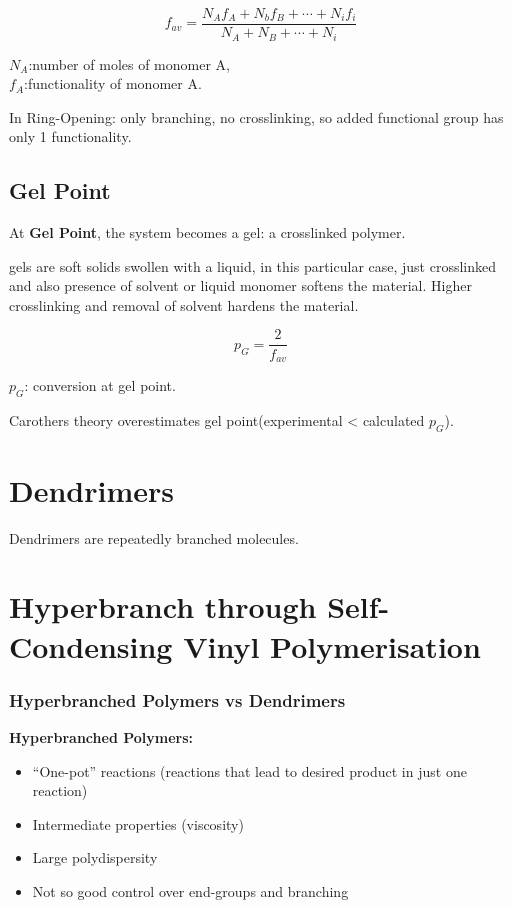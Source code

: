 \documentclass{NoteThesis/note-thesis}
\begin{document}
\begin{equation*}
    f_{av} = \frac{N_A f_A+N_b f_B+ \cdots +N_i f_i}{N_A+N_B+ \cdots +N_i}
\end{equation*}

{\noindent
$N_A$:number of moles of monomer A,\\
$f_A$:functionality of monomer A.}

In Ring-Opening: only branching, no crosslinking, so added functional group has only 1 functionality.

\subsection{Gel Point}

At \textbf{Gel Point}, the system becomes a gel:
a crosslinked polymer.

gels are soft solids swollen with a liquid, in this particular case, just crosslinked and also presence of solvent or liquid monomer softens the material. Higher crosslinking and removal of solvent hardens the material.

\begin{equation*}
    p_G = \frac{2}{f_{av}}
\end{equation*}

$p_G$: conversion at gel point.

\begin{mynote_env}[frametitle=Note]
    Carothers theory overestimates gel point(experimental < calculated $p_G$).
\end{mynote_env}

\newpage
\section{Dendrimers}

Dendrimers are repeatedly branched molecules.


\section[Hyperbranched through SCVP]{Hyperbranch through Self-Condensing Vinyl Polymerisation}

\subsubsection*{Hyperbranched Polymers vs Dendrimers}

\textbf{Hyperbranched Polymers:}
\begin{itemize}
    \item[$\checkmark$] ``One-pot'' reactions (reactions that lead to desired product in just one reaction)
    \item[$\checkmark$] Intermediate properties (viscosity)
    \item[$\times$] Large polydispersity
    \item[$\times$] Not so good control over end-groups and branching
\end{itemize}
\end{document}
